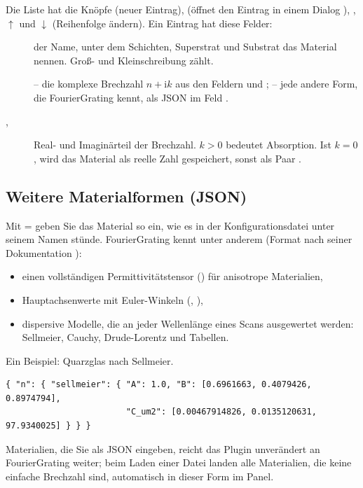 Die Liste hat die Knöpfe  (neuer Eintrag),  (öffnet den Eintrag in einem
Dialog ), , $\uparrow$ und $\downarrow$ (Reihenfolge ändern). Ein
Eintrag hat diese Felder:

\begin{description}
  \item[] der Name, unter dem Schichten, Superstrat und Substrat das Material nennen.
    Groß- und Kleinschreibung zählt.
  \item[]  -- die komplexe Brechzahl $n + \mathrm{i}k$ aus den Feldern
     und ;  -- jede andere Form, die FourierGrating kennt, als JSON im
    Feld .
  \item[, ] Real- und Imaginärteil der Brechzahl. $k > 0$ bedeutet Absorption.
    Ist $k = 0$, wird das Material als reelle Zahl gespeichert, sonst als Paar \code{[n, k]}.
\end{description}

\subsection{Weitere Materialformen (JSON)}

Mit  =  geben Sie das Material so ein, wie es in der Konfigurationsdatei
unter seinem Namen stünde. FourierGrating kennt unter anderem (Format nach seiner Dokumentation
):

\begin{itemize}
  \item einen vollständigen Permittivitätstensor () für anisotrope Materialien,
  \item Hauptachsenwerte mit Euler-Winkeln (, ),
  \item dispersive Modelle, die an jeder Wellenlänge eines Scans ausgewertet werden: Sellmeier,
    Cauchy, Drude-Lorentz und Tabellen.
\end{itemize}

Ein Beispiel: Quarzglas nach Sellmeier.

\begin{lstlisting}
{ "n": { "sellmeier": { "A": 1.0, "B": [0.6961663, 0.4079426, 0.8974794],
                        "C_um2": [0.00467914826, 0.0135120631, 97.9340025] } } }
\end{lstlisting}

Materialien, die Sie als JSON eingeben, reicht das Plugin unverändert an FourierGrating weiter; beim
Laden einer Datei landen alle Materialien, die keine einfache Brechzahl sind, automatisch in dieser
Form im Panel.

